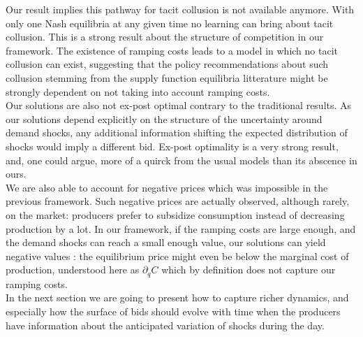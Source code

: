 Our result implies this pathway for tacit collusion is not available anymore. With only one Nash equilibria at any given time no learning can bring about tacit collusion. This is a strong result about the structure of competition in our framework. The existence of ramping costs leads to a model in which no tacit collusion can exist, suggesting that the policy recommendations about such collusion stemming from the supply function equilibria litterature might be strongly dependent on not taking into account ramping costs.\\

Our solutions are also not ex-post optimal contrary to the traditional results. As our solutions depend explicitly on the structure of the uncertainty around demand shocks, any additional information shifting the expected distribution of shocks would imply a different bid. Ex-post optimality is a very strong result, and, one could argue, more of a quirck from the usual models than its abscence in ours.\\

We are also able to account for negative prices which was impossible in the previous framework. Such negative prices are actually observed, although rarely, on the market: producers prefer to subsidize consumption instead of decreasing production by a lot. In our framework, if the ramping costs are large enough, and the demand shocks can reach a small enough value, our solutions can yield negative values : the equilibrium price might even be below the marginal cost of production, understood here as $\partial_q C$ which by definition does not capture our ramping costs.\\

%

In the next section we are going to present how to capture richer dynamics, and especially how the surface of bids should evolve with time when the producers have information about the anticipated variation of shocks during the day. 


